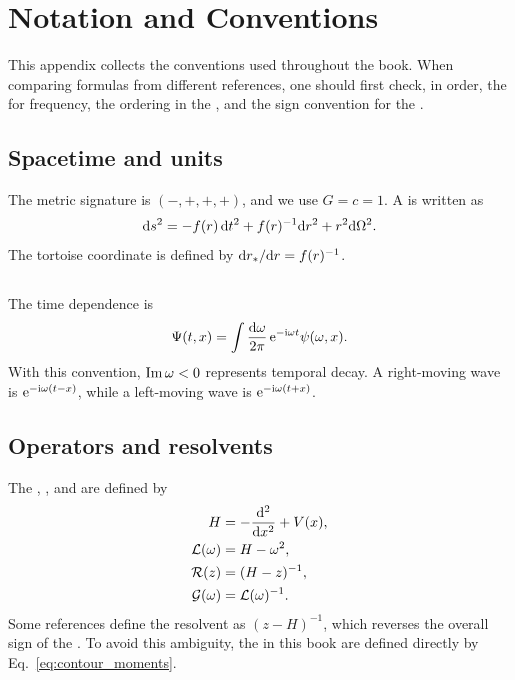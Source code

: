 \chapter{Notation and Conventions}
\label{app:conventions}

This appendix collects the conventions used throughout the book. When comparing formulas from different references, one should first check, in order, the  for frequency, the ordering in the , and the sign convention for the .

\section{Spacetime and units}

The metric signature is $(-,+,+,+)$, and we use  $G=c=1$. A  is written as
\begin{equation}
\mathrm{d} s^2
=
-f(r)\,\mathrm{d} t^2
+f(r)^{-1}\mathrm{d} r^2
+r^2\mathrm{d}\Omega^2.
\end{equation}
The tortoise coordinate is defined by $\mathrm{d}r_*/\mathrm{d} r=f(r)^{-1}$.

\section{}

The time dependence is
\begin{equation}
\Psi(t,x)
=
\int
\frac{\mathrm{d}\omega}{2\pi}
\,
\mathrm{e}^{-\mathrm{i}\omega t}
\psi(\omega,x).
\end{equation}
With this convention, $\operatorname{Im}\omega<0$ represents temporal decay. A right-moving wave is $\mathrm{e}^{-\mathrm{i}\omega(t-x)}$, while a left-moving wave is $\mathrm{e}^{-\mathrm{i}\omega(t+x)}$.

\section{Operators and resolvents}

The , , and  are defined by
\begin{align}
H
&=
-\frac{\mathrm{d}^2}{\mathrm{d} x^2}+V(x),
\\
\mathcal{L}(\omega)
&=
H-\omega^2,
\\
\mathcal{R}(z)
&=
(H-z)^{-1},
\\
\mathcal{G}(\omega)
&=
\mathcal{L}(\omega)^{-1}.
\end{align}
Some references define the resolvent as $(z-H)^{-1}$, which reverses the overall sign of the . To avoid this ambiguity, the  in this book are defined directly by Eq.~\eqref{eq:contour_moments}.


